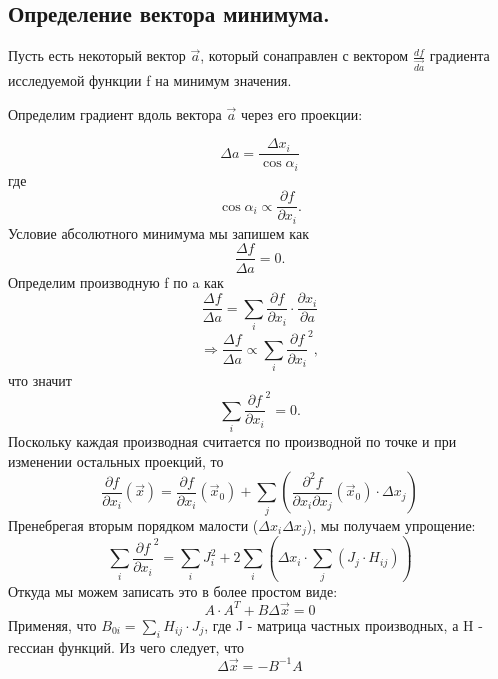 \documentclass[a4paper,12pt]{article}
\begin{document}
\subsection{Определение вектора минимума.}
Пусть есть некоторый вектор $\vec{a}$, который сонаправлен с вектором $\frac{df}{\vec{da}}$ градиента исследуемой функции f на минимум значения.

Определим градиент вдоль вектора $\vec{a}$ через его проекции:

\begin{equation}
	\Delta{a} = \frac{\Delta x_i} {\cos{\alpha_i}}
\end{equation}
где 
\begin{equation}
	\cos{\alpha_i} \propto \frac{\partial f}{\partial x_i}.
\end{equation}
Условие абсолютного минимума мы запишем как
\begin{equation}
	\frac{\Delta f}{\Delta a} = 0.
\end{equation}
Определим производную f по a как
\begin{equation}
	\frac{\Delta f}{\Delta a} = \sum_{i} \frac{\partial f}{\partial x_i} \cdot \frac{\partial x_i}{\partial a}
\end{equation}
\begin{equation}
	\Rightarrow \frac{\Delta f}{\Delta a} \propto \sum_{i} \frac{\partial f}{\partial x_i}^2,
\end{equation}
что значит
\begin{equation}
	\sum_{i} \frac{\partial f}{\partial x_i}^2 = 0.
\end{equation}
Поскольку каждая производная считается по производной по точке и при изменении остальных проекций, то
\begin{equation}
	\frac{\partial f}{\partial x_i} (\vec{x}) = \frac{\partial f}{\partial x_i} (\vec{x}_{0}) + \sum_{j} (\frac{\partial^2 f}{\partial x_i \partial x_j}(\vec{x}_0) \cdot \Delta x_j)
\end{equation}
Пренебрегая вторым порядком малости ($\Delta x_i \Delta x_j$), мы получаем упрощение:
\begin{equation}
	\sum_{i} \frac{\partial f}{\partial x_i}^2 = \sum_{i} J_i^2 + 2\sum_{i} (\Delta x_i \cdot \sum_{j} (J_j \cdot H_{ij}))
\end{equation}
Откуда мы можем записать это в более простом виде:
\begin{equation}
	A\cdot A^T + B\Delta{\vec{x}} = 0
\end{equation}
Применяя, что $B_{0i}= \sum_{i} H_{ij}\cdot J_j$, где J - матрица частных производных, а H - гессиан функций.
Из чего следует, что
\begin{equation}
	\Delta{\vec{x}} = -B^{-1}A 
\end{equation}
\end{document}
